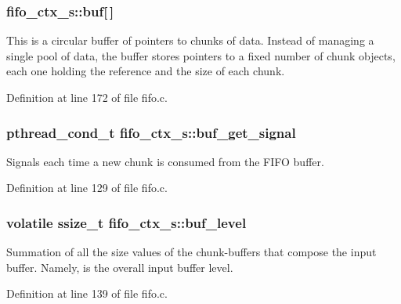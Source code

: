 \subsubsection[{\texorpdfstring{buf}{buf}}]{ fifo\+\_\+ctx\+\_\+s\+::buf\mbox{[}$\,$\mbox{]}}\hypertarget{structfifo__ctx__s_aaff82bce9d68fd7f61378270841b4969}{}\label{structfifo__ctx__s_aaff82bce9d68fd7f61378270841b4969}
This is a circular buffer of pointers to chunks of data. Instead of managing a single pool of data, the buffer stores pointers to a fixed number of chunk objects, each one holding the reference and the size of each chunk. 

Definition at line 172 of file fifo.\+c.

\subsubsection[{\texorpdfstring{buf\+\_\+get\+\_\+signal}{buf_get_signal}}]{\setlength{\rightskip}{0pt plus 5cm}pthread\+\_\+cond\+\_\+t fifo\+\_\+ctx\+\_\+s\+::buf\+\_\+get\+\_\+signal}\hypertarget{structfifo__ctx__s_af13501e5f83d5d1561bf76577c490f23}{}\label{structfifo__ctx__s_af13501e5f83d5d1561bf76577c490f23}
Signals each time a new chunk is consumed from the F\+I\+FO buffer. 

Definition at line 129 of file fifo.\+c.

\subsubsection[{\texorpdfstring{buf\+\_\+level}{buf_level}}]{\setlength{\rightskip}{0pt plus 5cm}volatile ssize\+\_\+t fifo\+\_\+ctx\+\_\+s\+::buf\+\_\+level}\hypertarget{structfifo__ctx__s_a9661ff316afd08e4eb0919cd02e355ce}{}\label{structfifo__ctx__s_a9661ff316afd08e4eb0919cd02e355ce}
Summation of all the size values of the chunk-\/buffers that compose the input buffer. Namely, is the overall input buffer level. 

Definition at line 139 of file fifo.\+c.


